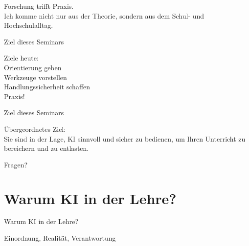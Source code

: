 \documentclass[14pt, aspectratio=169]{beamer}
\begin{document}
\begin{frame}{}
\begin{center}
    \Large Forschung trifft Praxis.\\
    \vspace{0.3cm}
    \normalsize Ich komme nicht nur aus der Theorie, sondern aus dem Schul- und Hochschulalltag.
\end{center}
\end{frame}


\begin{frame}{Ziel dieses Seminars}
\begin{center}
    \Large Ziele heute:\\
    
    \vspace{0.3cm}
    \normalsize Orientierung geben\\
    \normalsize Werkzeuge vorstellen\\
    \normalsize Handlungssicherheit schaffen\\
    \normalsize Praxis!
    
\end{center}
\end{frame}

\begin{frame}{Ziel dieses Seminars}
\begin{center}
    \Large Übergeordnetes Ziel:\\
    \vspace{0.5cm}
    \normalsize Sie sind in der Lage, KI sinnvoll und sicher zu bedienen, um Ihren Unterricht zu bereichern und zu entlasten.
\end{center}
\end{frame}

\begin{frame}{}
\begin{center}
    \Large Fragen?
\end{center}
\end{frame}


\section{Warum KI in der Lehre?}

\begin{frame}{}
  \begin{center}
    \Huge Warum KI in der Lehre?
    
    \vspace{0.5cm}
    \Large Einordnung, Realität, Verantwortung
  \end{center}
\end{frame}
\end{document}
